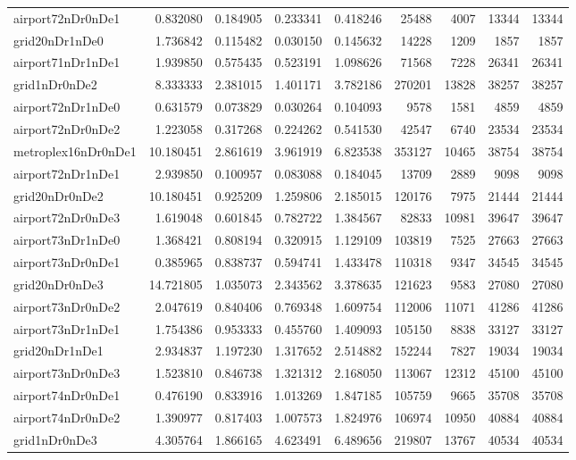 \documentclass[../../../thesis.tex]{subfiles}
\begin{document}
\begin{longtable}{|l|r|r|r|r|r|r|r|r|}
airport72nDr0nDe1 & 0.832080 & 0.184905 & 0.233341 & 0.418246 & 25488 & 4007 & 13344 & 13344 \\
grid20nDr1nDe0 & 1.736842 & 0.115482 & 0.030150 & 0.145632 & 14228 & 1209 & 1857 & 1857 \\
airport71nDr1nDe1 & 1.939850 & 0.575435 & 0.523191 & 1.098626 & 71568 & 7228 & 26341 & 26341 \\
grid1nDr0nDe2 & 8.333333 & 2.381015 & 1.401171 & 3.782186 & 270201 & 13828 & 38257 & 38257 \\
airport72nDr1nDe0 & 0.631579 & 0.073829 & 0.030264 & 0.104093 & 9578 & 1581 & 4859 & 4859 \\
airport72nDr0nDe2 & 1.223058 & 0.317268 & 0.224262 & 0.541530 & 42547 & 6740 & 23534 & 23534 \\
metroplex16nDr0nDe1 & 10.180451 & 2.861619 & 3.961919 & 6.823538 & 353127 & 10465 & 38754 & 38754 \\
airport72nDr1nDe1 & 2.939850 & 0.100957 & 0.083088 & 0.184045 & 13709 & 2889 & 9098 & 9098 \\
grid20nDr0nDe2 & 10.180451 & 0.925209 & 1.259806 & 2.185015 & 120176 & 7975 & 21444 & 21444 \\
airport72nDr0nDe3 & 1.619048 & 0.601845 & 0.782722 & 1.384567 & 82833 & 10981 & 39647 & 39647 \\
airport73nDr1nDe0 & 1.368421 & 0.808194 & 0.320915 & 1.129109 & 103819 & 7525 & 27663 & 27663 \\
airport73nDr0nDe1 & 0.385965 & 0.838737 & 0.594741 & 1.433478 & 110318 & 9347 & 34545 & 34545 \\
grid20nDr0nDe3 & 14.721805 & 1.035073 & 2.343562 & 3.378635 & 121623 & 9583 & 27080 & 27080 \\
airport73nDr0nDe2 & 2.047619 & 0.840406 & 0.769348 & 1.609754 & 112006 & 11071 & 41286 & 41286 \\
airport73nDr1nDe1 & 1.754386 & 0.953333 & 0.455760 & 1.409093 & 105150 & 8838 & 33127 & 33127 \\
grid20nDr1nDe1 & 2.934837 & 1.197230 & 1.317652 & 2.514882 & 152244 & 7827 & 19034 & 19034 \\
airport73nDr0nDe3 & 1.523810 & 0.846738 & 1.321312 & 2.168050 & 113067 & 12312 & 45100 & 45100 \\
airport74nDr0nDe1 & 0.476190 & 0.833916 & 1.013269 & 1.847185 & 105759 & 9665 & 35708 & 35708 \\
airport74nDr0nDe2 & 1.390977 & 0.817403 & 1.007573 & 1.824976 & 106974 & 10950 & 40884 & 40884 \\
grid1nDr0nDe3 & 4.305764 & 1.866165 & 4.623491 & 6.489656 & 219807 & 13767 & 40534 & 40534 \\

\end{longtable}
\end{document}
